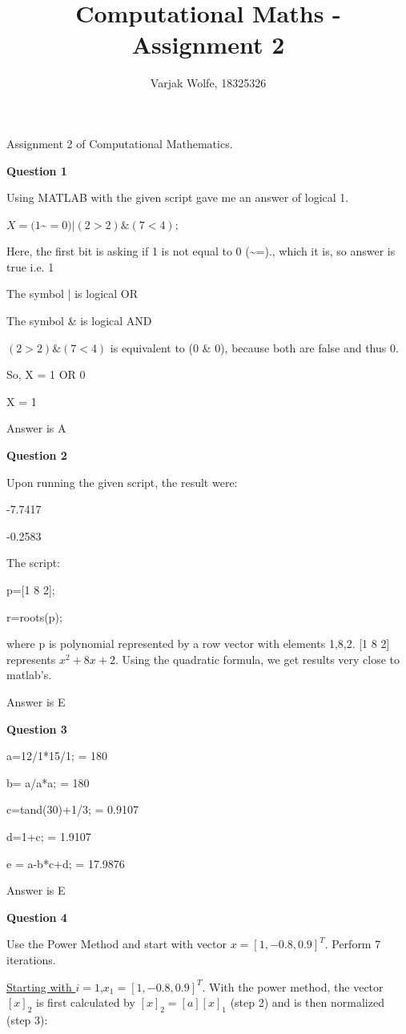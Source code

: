 \documentclass{article}
\title{Computational Maths - Assignment 2}
\author{Varjak Wolfe, 18325326}
\begin{document}
\maketitle

Assignment 2 of Computational Mathematics.


\textbf{Question 1}

Using MATLAB with the given script gave me an answer of logical 1.

$X=(1$\textasciitilde$=0)|(2>2)\&(7<4);$

Here, the first bit is asking if 1 is not equal to 0 (\textasciitilde=)., which it is, so answer is true i.e. 1

The symbol | is logical OR

The symbol \& is logical AND

$(2>2)\&(7<4)$ is equivalent to (0 \& 0), because both are false and thus 0.

So, X = 1 OR 0

X = 1

Answer is A


\textbf{Question 2}

Upon running the given script, the result were:

   -7.7417

   -0.2583

The script:

p=[1 8 2]; 

r=roots(p);

where p is polynomial represented by a row vector with elements 1,8,2. 
[1 8 2] represents $x^2 + 8x + 2$. Using the quadratic formula, we get results very close to matlab's.

Answer is E


\textbf{Question 3}

a=12/1*15/1;  	= 180

b= a/a*a; 		= 180

c=tand(30)+1/3; 	=  0.9107

d=1+c; 		=   1.9107

e = a-b*c+d;	= 17.9876

Answer is E

\textbf{Question 4}


Use the Power Method and start with vector $x = [1, -0.8, 0.9]^T$. Perform 7 iterations.

\underline{Starting with $i = 1$},$ x_1 = [1, -0.8, 0.9]^T$.
\newline
With the power method, the vector $[x]_2$ is first calculated by $[x]_2 = [a][x]_1$ (step 2) and is then normalized (step 3):
\end{document}

